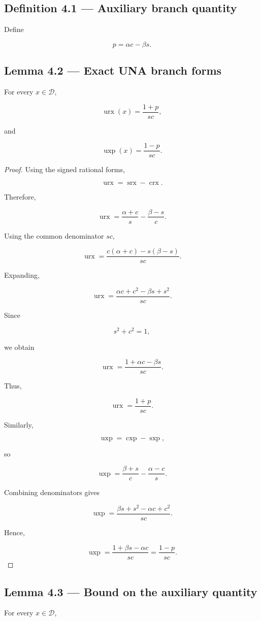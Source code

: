 \documentclass[11pt,oneside,openany]{book}
\newcommand{\PCsubsection}[1]{%
  \subsection*{#1}%
}
\begin{document}
\PCsubsection{Definition 4.1 --- Auxiliary branch quantity}

Define

\[
p=\alpha c-\beta s.
\]

\PCsubsection{Lemma 4.2 --- Exact UNA branch forms}

For every \(x\in\mathcal D\),

\[
\boxed{ \operatorname{urx}(x) = \frac{1+p}{sc} },
\]

and

\[
\boxed{ \operatorname{uxp}(x) = \frac{1-p}{sc} }.
\]

\begin{proof}
Using the signed rational forms,

\[
\operatorname{urx} = \operatorname{srx}-\operatorname{crx}.
\]

Therefore,

\[
\operatorname{urx} = \frac{\alpha+c}{s} - \frac{\beta-s}{c}.
\]

Using the common denominator \(sc\),

\[
\operatorname{urx} = \frac{c(\alpha+c)-s(\beta-s)}{sc}.
\]

Expanding,

\[
\operatorname{urx} = \frac{\alpha c+c^2-\beta s+s^2}{sc}.
\]

Since

\[
s^2+c^2=1,
\]

we obtain

\[
\operatorname{urx} = \frac{1+\alpha c-\beta s}{sc}.
\]

Thus,

\[
\operatorname{urx} = \frac{1+p}{sc}.
\]

Similarly,

\[
\operatorname{uxp} = \operatorname{cxp}-\operatorname{sxp},
\]

so

\[
\operatorname{uxp} = \frac{\beta+s}{c} - \frac{\alpha-c}{s}.
\]

Combining denominators gives

\[
\operatorname{uxp} = \frac{\beta s+s^2-\alpha c+c^2}{sc}.
\]

Hence,

\[
\operatorname{uxp} = \frac{1+\beta s-\alpha c}{sc} = \frac{1-p}{sc}.
\]

\end{proof}

\PCsubsection{Lemma 4.3 --- Bound on the auxiliary quantity}

For every \(x\in\mathcal D\),
\end{document}

